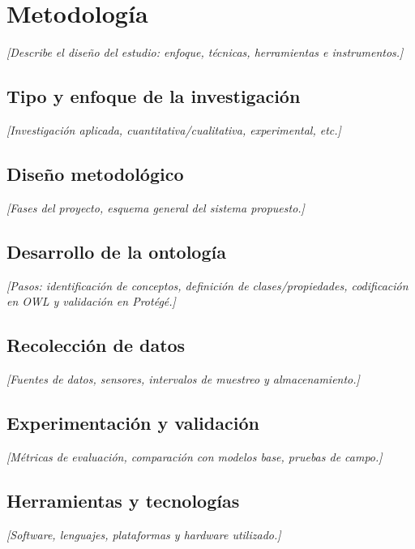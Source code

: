 
\chapter{Metodología}
\label{cap:metodologia}

\textit{[Describe el diseño del estudio: enfoque, técnicas, herramientas e instrumentos.]}

\section{Tipo y enfoque de la investigación}
\label{sec:tipo-investigacion}

\textit{[Investigación aplicada, cuantitativa/cualitativa, experimental, etc.]}

\section{Diseño metodológico}
\label{sec:diseno}

\textit{[Fases del proyecto, esquema general del sistema propuesto.]}

\section{Desarrollo de la ontología}
\label{sec:desarrollo-ontologia}

\textit{[Pasos: identificación de conceptos, definición de clases/propiedades,
codificación en OWL y validación en Protégé.]}

\section{Recolección de datos}
\label{sec:datos}

\textit{[Fuentes de datos, sensores, intervalos de muestreo y almacenamiento.]}

\section{Experimentación y validación}
\label{sec:experimentacion}

\textit{[Métricas de evaluación, comparación con modelos base, pruebas de campo.]}

\section{Herramientas y tecnologías}
\label{sec:herramientas}

\textit{[Software, lenguajes, plataformas y hardware utilizado.]}

